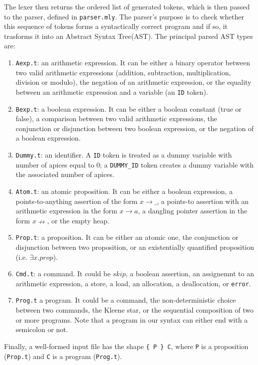 \documentclass[parskip=half]{scrartcl}
\begin{document}
The lexer then returns the ordered list of generated tokens, which is then passed to the parser, defined in \texttt{parser.mly}.
The parser's purpose is to check whether this sequence of tokens forms a syntactically correct program and if so, it trasforms it into an Abstract Syntax Tree(AST).
The principal parsed AST types are:

\begin{enumerate}
  \item \texttt{Aexp.t}: an arithmetic expression. It can be either a binary operator between two valid arithmetic expressions (addition, subtraction, multiplication, division or modulo), the negation of an arithmetic expression, or the equality between an arithmetic expression and a variable (an \texttt{ID} token).

  \item \texttt{Bexp.t}: a boolean expression. It can be either a boolean constant (true or false), a comparison between two valid arithmetic expressions, the conjunction or disjunction between two boolean expression, or the negation of a boolean expression.

  \item \texttt{Dummy.t}: an identifier. A \texttt{ID} token is treated as a dummy variable with number of apices equal to 0; a \texttt{DUMMY\_ID} token creates a dummy variable with the associated number of apices.
  
  \item \texttt{Atom.t}: an atomic proposition. It can be either a boolean expression, a points-to-anything assertion of the form $x \rightarrow \_$, a points-to assertion with an arithmetic expression in the form $x \rightarrow a$, a dangling pointer assertion in the form $x \nrightarrow$, or the empty heap.
  
  \item \texttt{Prop.t}: a proposition. It can be either an atomic one, the conjunction or disjunction between two proposition, or an existentially quantified proposition (i.e. $\exists x. prop$).
  
  \item \texttt{Cmd.t}: a command. It could be $skip$, a boolean assertion, an assignemnt to an arithmetic expression, a store, a load, an allocation, a deallocation, or \texttt{error}.
  
  \item \texttt{Prog.t} a program. It could be a command, the non-deterministic choice between two commands, the Kleene star, or the sequential composition of two or more programs. Note that a program in our syntax can either end with a semicolon or not.
\end{enumerate}
Finally, a well-formed input file has the shape \verb|{ P } C|, where \texttt{P} is a proposition (\texttt{Prop.t}) and \texttt{C} is a program (\texttt{Prog.t}).
\end{document}
